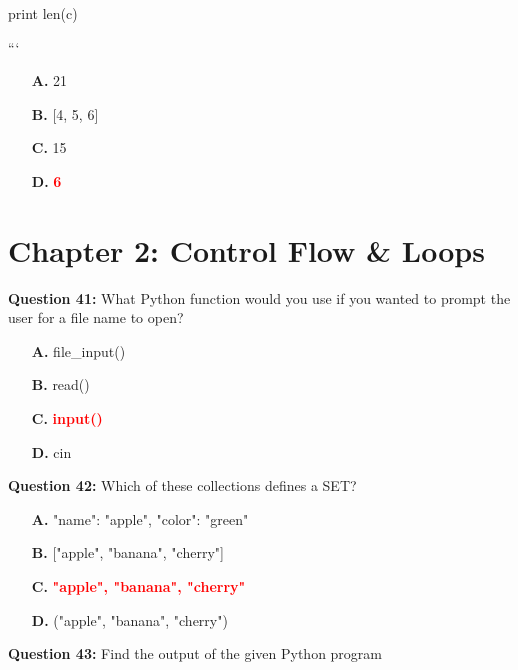 \documentclass[12pt,a4paper]{article}
\begin{document}
\newline
print len(c)\newline

\newline
```

\begin{itemize}
    \item[\textbf{A.}] 21
    \item[\textbf{B.}] [4, 5, 6]
    \item[\textbf{C.}] 15
    \item[\textbf{D.}] \textcolor{red}{\textbf{6}}
\end{itemize}

\vspace{0.5cm}

\section{Chapter 2: Control Flow & Loops}

\textbf{Question 41:} What Python function would you use if you wanted to prompt the user for a file name to open?

\begin{itemize}
    \item[\textbf{A.}] file_input()
    \item[\textbf{B.}] read()
    \item[\textbf{C.}] \textcolor{red}{\textbf{input()}}
    \item[\textbf{D.}] cin
\end{itemize}

\vspace{0.5cm}

\textbf{Question 42:} Which of these collections defines a SET?

\begin{itemize}
    \item[\textbf{A.}] "name": "apple", "color": "green"
    \item[\textbf{B.}] ["apple", "banana", "cherry"]
    \item[\textbf{C.}] \textcolor{red}{\textbf{"apple", "banana", "cherry"}}
    \item[\textbf{D.}] ("apple", "banana", "cherry")
\end{itemize}

\vspace{0.5cm}

\textbf{Question 43:} Find the output of the given Python program\newline
\end{document}
